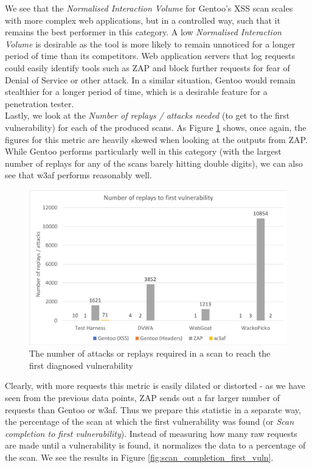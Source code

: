  We see that the \textit{Normalised Interaction Volume} for Gentoo's XSS scan scales with more complex web applications, but in a controlled way, such that it remains the best performer in this category. A low \textit{Normalised Interaction Volume} is desirable as the tool is more likely to remain unnoticed for a longer period of time than its competitors. Web application servers that log requests could easily identify tools such as ZAP and block further requests for fear of Denial of Service or other attack. In a similar situation, Gentoo would remain stealthier for a longer period of time, which is a desirable feature for a penetration tester. \\ 

Lastly, we look at the \textit{Number of replays / attacks needed} (to get to the first vulnerability) for each of the produced scans. As Figure \ref{fig:number_replays_first_vuln} shows, once again, the figures for this metric are heavily skewed when looking at the outputs from ZAP. While Gentoo performs particularly well in this category (with the largest number of replays for any of the scans barely hitting double digits), we can also see that w3af performs reasonably well. \\

\begin{figure}[h!]
	\centering
	\includegraphics[width=\textwidth]{images/evaluation/number_replays_first_vuln.png}
	\caption{The number of attacks or replays required in a scan to reach the first diagnosed vulnerability}
	\label{fig:number_replays_first_vuln}
\end{figure}


 Clearly, with more requests this metric is easily dilated or distorted - as we have seen from the previous data points, ZAP sends out a far larger number of requests than Gentoo or w3af. Thus we prepare this statistic in a separate way, the percentage of the scan at which the first vulnerability was found (or \textit{Scan completion to first vulnerability}). Instead of measuring how many raw requests are made until a vulnerability is found, it normalizes the data to a percentage of the scan. We see the results in Figure \ref{fig:scan_completion_first_vuln}. \\
 
